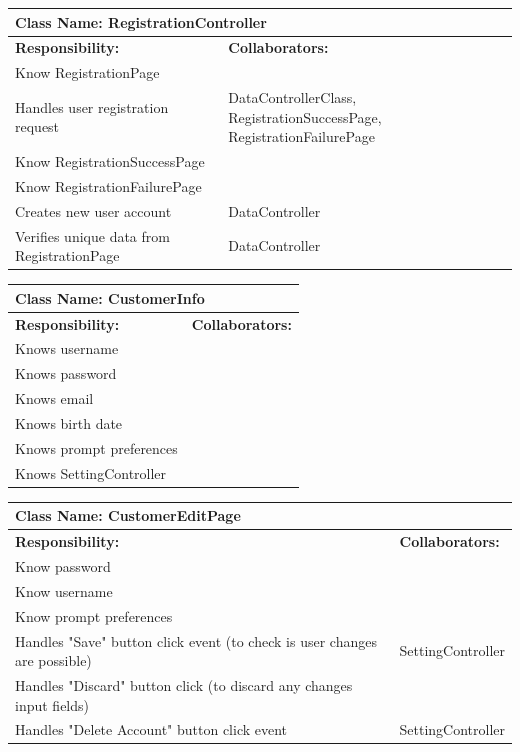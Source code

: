 \documentclass[]{article}
\begin{document}
	\begin{table}[H]
	\centering
	\begin{tabular}{|p{6cm}|p{6cm}|}
	\hline 
		\multicolumn{2}{|l|}{\textbf{Class Name: RegistrationController}} \\
	\hline
	\textbf{Responsibility:} & \textbf{Collaborators:} \\
	\hline
	Know RegistrationPage&\\ \hline
	Handles user registration request & DataControllerClass, RegistrationSuccessPage, RegistrationFailurePage\\ \hline
	Know RegistrationSuccessPage &\\ \hline
	Know RegistrationFailurePage &\\ \hline
    Creates new user account & DataController \\ \hline
    Verifies unique data from RegistrationPage & DataController\\ \hline
	\end{tabular}
	\end{table}
	
	\begin{table}[H]
	\centering
	\begin{tabular}{|p{6cm}|p{6cm}|}
	\hline 
		\multicolumn{2}{|l|}{\textbf{Class Name: CustomerInfo}} \\
	\hline
	\textbf{Responsibility:} & \textbf{Collaborators:} \\
	\hline 
	Knows username&\\ \hline
	Knows password&\\ \hline 
	Knows email&\\ \hline 
	Knows birth date&\\ \hline 
	Knows prompt preferences &\\ \hline
	Knows SettingController &\\ \hline
	\end{tabular}
	\end{table}
		
	\begin{table}[H]
	\centering
	\begin{tabular}{|p{6cm}|p{6cm}|}
	\hline 
		\multicolumn{2}{|l|}{\textbf{Class Name: CustomerEditPage}} \\
	\hline
	\textbf{Responsibility:} & \textbf{Collaborators:} \\
	\hline 
	Know password & \\ \hline
	Know username & \\ \hline
	Know prompt preferences & \\ \hline
	Handles "Save" button click event  (to check is user changes are possible) & SettingController\\ \hline 
    Handles "Discard" button click (to discard any changes input fields) & \\ \hline
	Handles "Delete Account" button click event  & SettingController\\ \hline
	\end{tabular}
	\end{table}
	
\end{document}
